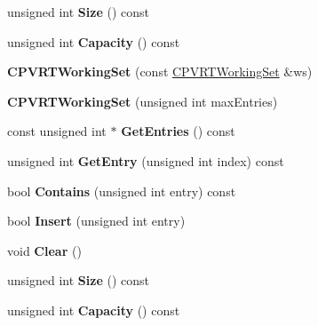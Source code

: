\begin{DoxyCompactItemize}
\item 
\hypertarget{class_c_p_v_r_t_working_set_a9675c980ecaaea772566b87912ce8970}{unsigned int {\bfseries Size} () const }\label{class_c_p_v_r_t_working_set_a9675c980ecaaea772566b87912ce8970}

\item 
\hypertarget{class_c_p_v_r_t_working_set_afc8639149762c35f197a9b046a7531d4}{unsigned int {\bfseries Capacity} () const }\label{class_c_p_v_r_t_working_set_afc8639149762c35f197a9b046a7531d4}

\item 
\hypertarget{class_c_p_v_r_t_working_set_acc5d10f16902c6ceb1120befe15cfa8f}{{\bfseries C\+P\+V\+R\+T\+Working\+Set} (const \hyperlink{class_c_p_v_r_t_working_set}{C\+P\+V\+R\+T\+Working\+Set} \&ws)}\label{class_c_p_v_r_t_working_set_acc5d10f16902c6ceb1120befe15cfa8f}

\item 
\hypertarget{class_c_p_v_r_t_working_set_aeab114a06ca2dfe1e912904fde1a3849}{{\bfseries C\+P\+V\+R\+T\+Working\+Set} (unsigned int max\+Entries)}\label{class_c_p_v_r_t_working_set_aeab114a06ca2dfe1e912904fde1a3849}

\item 
\hypertarget{class_c_p_v_r_t_working_set_a011faa4c0c71ca4ffc7571d41c544614}{const unsigned int $\ast$ {\bfseries Get\+Entries} () const }\label{class_c_p_v_r_t_working_set_a011faa4c0c71ca4ffc7571d41c544614}

\item 
\hypertarget{class_c_p_v_r_t_working_set_acca3949e031b08108e161b3e8bf13e81}{unsigned int {\bfseries Get\+Entry} (unsigned int index) const }\label{class_c_p_v_r_t_working_set_acca3949e031b08108e161b3e8bf13e81}

\item 
\hypertarget{class_c_p_v_r_t_working_set_a94abd2835b3fd681c27b242488303451}{bool {\bfseries Contains} (unsigned int entry) const }\label{class_c_p_v_r_t_working_set_a94abd2835b3fd681c27b242488303451}

\item 
\hypertarget{class_c_p_v_r_t_working_set_ae88d3502e657c02c2a9e284a90198c48}{bool {\bfseries Insert} (unsigned int entry)}\label{class_c_p_v_r_t_working_set_ae88d3502e657c02c2a9e284a90198c48}

\item 
\hypertarget{class_c_p_v_r_t_working_set_ae86c00fa370f5de4072a61b8f65e6fad}{void {\bfseries Clear} ()}\label{class_c_p_v_r_t_working_set_ae86c00fa370f5de4072a61b8f65e6fad}

\item 
\hypertarget{class_c_p_v_r_t_working_set_a9675c980ecaaea772566b87912ce8970}{unsigned int {\bfseries Size} () const }\label{class_c_p_v_r_t_working_set_a9675c980ecaaea772566b87912ce8970}

\item 
\hypertarget{class_c_p_v_r_t_working_set_afc8639149762c35f197a9b046a7531d4}{unsigned int {\bfseries Capacity} () const }\label{class_c_p_v_r_t_working_set_afc8639149762c35f197a9b046a7531d4}

\end{DoxyCompactItemize}



